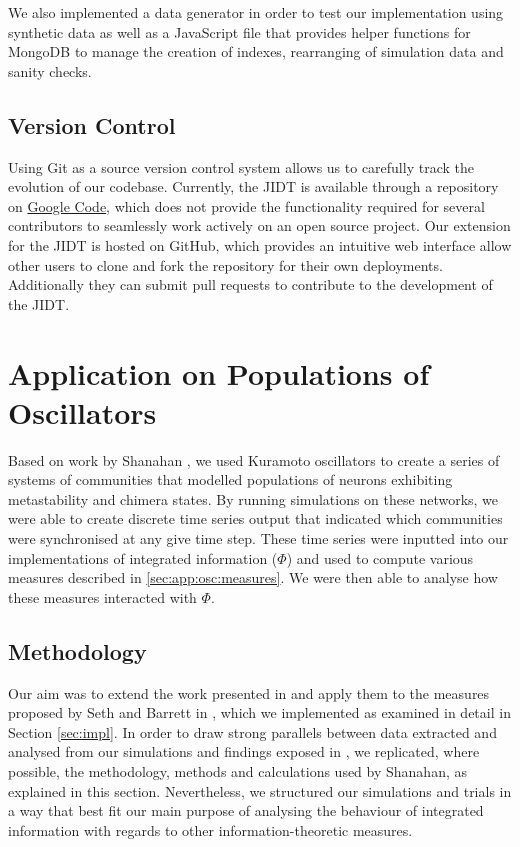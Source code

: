 \documentclass[a4paper,11pt]{article}
\begin{document}
We also implemented a data generator in order to test our implementation using synthetic data as well as a JavaScript file that provides helper functions for MongoDB to manage the creation of indexes, rearranging of simulation data and sanity checks.

\subsection{Version Control}
Using Git as a source version control system allows us to carefully track the evolution of our codebase. Currently, the JIDT is available through a repository on \href{https://code.google.com/}{Google Code}, which does not provide the functionality required for several contributors to seamlessly work actively on an open source project. Our extension for the JIDT is hosted on GitHub, which provides an intuitive web interface allow other users to clone and fork the repository for their own deployments. Additionally they can submit pull requests to contribute to the development of the JIDT.

\clearpage
\section{Application on Populations of Oscillators}
\label{MSUKO}

Based on work by Shanahan \cite{Shanahan2010}, we used Kuramoto oscillators to create a series of systems of communities that modelled populations of neurons exhibiting metastability and chimera states. By running simulations on these networks, we were able to create discrete time series output that indicated which communities were synchronised at any give time step. These time series were inputted into our implementations of integrated information ($\Phi$) and used to compute various measures described in \ref{sec:app:osc:measures}. We were then able to analyse how these measures interacted with $\Phi$.

\subsection{Methodology}
\label{sec:osc:methods}
Our aim was to extend the work presented in \cite{Shanahan2010} and apply them to the measures proposed by Seth and Barrett in \cite{Barrett2011}, which we implemented as examined in detail in Section \ref{sec:impl}. In order to draw strong parallels between data extracted and analysed from our simulations and findings exposed in \cite{Shanahan2010}, we replicated, where possible, the methodology, methods and calculations used by Shanahan, as explained in this section. Nevertheless, we structured our simulations and trials in a way that best fit our main purpose of analysing the behaviour of integrated information with regards to other information-theoretic measures.
\end{document}
